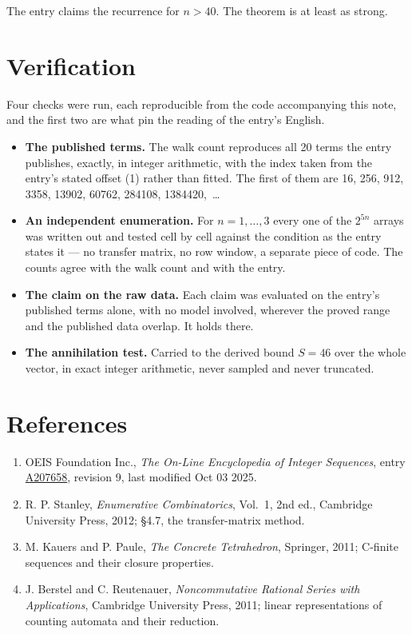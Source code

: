 \documentclass[11pt]{article}
\theoremstyle{definition}
\begin{document}
The entry claims the recurrence for $n > 40$. The theorem is at least as strong.

\section{Verification}

Four checks were run, each reproducible from the code accompanying this note, and the first two are what pin the reading of the entry's English.

\begin{itemize}

\item {\bfseries The published terms.} The walk count reproduces all 20 terms the entry publishes, exactly, in integer arithmetic, with the index taken from the entry's stated offset (1) rather than fitted. The first of them are 16, 256, 912, 3358, 13902, 60762, 284108, 1384420,~\dots

\item {\bfseries An independent enumeration.} For $n = 1,\dots,3$ every one of the $2^{5n}$ arrays was written out and tested cell by cell against the condition as the entry states it --- no transfer matrix, no row window, a separate piece of code. The counts agree with the walk count and with the entry.

\item {\bfseries The claim on the raw data.} Each claim was evaluated on the entry's published terms alone, with no model involved, wherever the proved range and the published data overlap. It holds there.

\item {\bfseries The annihilation test.} Carried to the derived bound $S = 46$ over the whole vector, in exact integer arithmetic, never sampled and never truncated.

\end{itemize}

\section{References}

\begin{enumerate}

\item OEIS Foundation Inc., \emph{The On-Line Encyclopedia of Integer Sequences}, entry \href{https://oeis.org/A207658}{A207658}, revision 9, last modified Oct 03 2025.

\item R. P. Stanley, \emph{Enumerative Combinatorics}, Vol.~1, 2nd ed., Cambridge University Press, 2012; \S4.7, the transfer-matrix method.

\item M. Kauers and P. Paule, \emph{The Concrete Tetrahedron}, Springer, 2011; C-finite sequences and their closure properties.

\item J. Berstel and C. Reutenauer, \emph{Noncommutative Rational Series with Applications}, Cambridge University Press, 2011; linear representations of counting automata and their reduction.

\end{enumerate}
\end{document}
